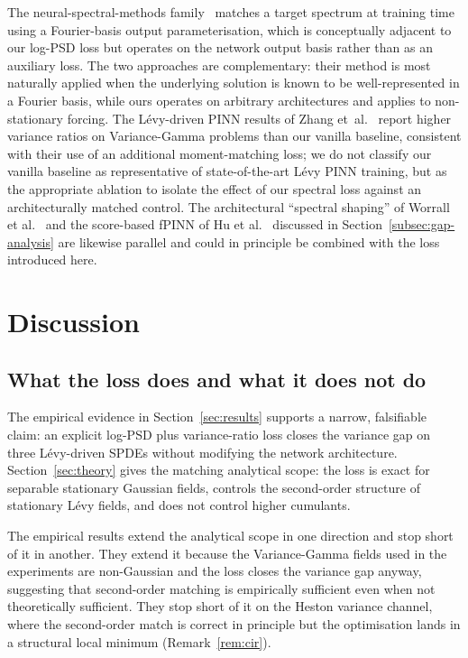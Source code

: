 \documentclass[review,12pt]{elsarticle}
\begin{document}
The neural-spectral-methods family~\cite{DuEtAl2024NSM} matches a
target spectrum at training time using a Fourier-basis output
parameterisation, which is conceptually adjacent to our log-PSD
loss but operates on the network output basis rather than as an
auxiliary loss. The two approaches are complementary: their
method is most naturally applied when the underlying solution is
known to be well-represented in a Fourier basis, while ours
operates on arbitrary architectures and applies to non-stationary
forcing. The L\'evy-driven PINN results of Zhang
et~al.~\cite{ZhangEtAl2025LevyPINN} report higher variance ratios
on Variance-Gamma problems than our vanilla baseline, consistent
with their use of an additional moment-matching loss; we do not
classify our vanilla baseline as representative of
state-of-the-art L\'evy PINN training, but as the appropriate
ablation to isolate the effect of our spectral loss against an
architecturally matched control. The architectural ``spectral
shaping'' of Worrall et al.~\cite{Worrall2025SpectralShaping} and
the score-based fPINN of Hu et al.~\cite{Hu2024ScoreFPINN}
discussed in Section~\ref{subsec:gap-analysis} are likewise
parallel and could in principle be combined with the loss
introduced here.

\section{Discussion}
\label{sec:discussion}

\subsection{What the loss does and what it does not do}

The empirical evidence in Section~\ref{sec:results} supports a
narrow, falsifiable claim: an explicit log-PSD plus
variance-ratio loss closes the variance gap on three L\'evy-driven
SPDEs without modifying the network architecture.
Section~\ref{sec:theory} gives the matching analytical scope: the
loss is exact for separable stationary Gaussian fields, controls
the second-order structure of stationary L\'evy fields, and does
not control higher cumulants.

The empirical results extend the analytical scope in one
direction and stop short of it in another. They extend it because
the Variance-Gamma fields used in the experiments are
non-Gaussian and the loss closes the variance gap anyway,
suggesting that second-order matching is empirically sufficient
even when not theoretically sufficient. They stop short of it on
the Heston variance channel, where the second-order match is
correct in principle but the optimisation lands in a structural
local minimum (Remark~\ref{rem:cir}).
\end{document}
